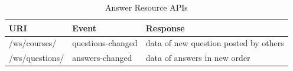 \begin{table}[!htbp]
\centering
\begin{tabularx}{\textwidth}{@{}llX@{}}
\toprule
URI                       & Event           & Response                           \\ \midrule
/ws/courses/            & questions-changed       &  data of new question posted by others \\
/ws/questions/          & answers-changed      &  data of answers in new order          \\ \bottomrule
\end{tabularx}
\caption{Answer Resource APIs}
\label{table:websocket-def}
\end{table}

